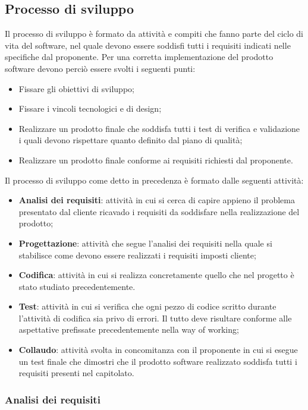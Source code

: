 \subsection{Processo di sviluppo}
Il processo di sviluppo è formato da attività e compiti che fanno parte del ciclo di vita del software, nel quale devono essere soddisfi tutti i requisiti indicati nelle specifiche dal proponente. Per una corretta implementazione del prodotto software devono perciò essere svolti i seguenti punti: 
\begin{itemize}
	\item Fissare gli obiettivi di sviluppo;
	\item Fissare i vincoli tecnologici e di design;
	\item Realizzare un prodotto finale che soddisfa tutti i test di verifica e validazione i quali devono rispettare quanto definito dal piano di qualità;
	\item Realizzare un prodotto finale conforme ai requisiti richiesti dal proponente.
\end{itemize}		
Il processo di sviluppo come detto in precedenza è formato dalle seguenti attività:
\begin{itemize}
	\item \textbf{Analisi dei requisiti}: attività in cui si cerca di capire appieno il problema presentato dal cliente ricavado i requisiti da soddisfare nella realizzazione del prodotto;
	\item \textbf{Progettazione}: attività che segue l'analisi dei requisiti nella quale si stabilisce come devono essere realizzati i requisiti imposti cliente;
	\item \textbf{Codifica}: attività in cui si realizza concretamente quello che nel progetto è stato  studiato precedentemente.
	\item \textbf{Test}: attività in cui si verifica che ogni pezzo di codice scritto durante l'attività di codifica sia privo di errori. Il tutto deve risultare conforme alle aspettative prefissate precedentemente nella way of working;
\item \textbf{Collaudo}: attività svolta in concomitanza con il proponente in cui si esegue un test finale che dimostri che il prodotto software realizzato soddisfa tutti i requisiti presenti nel capitolato.
\end{itemize}
\subsubsection{Analisi dei requisiti}
